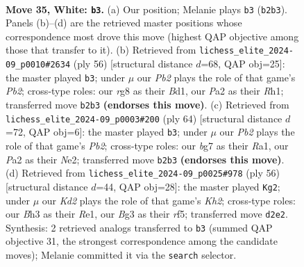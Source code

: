 \documentclass[11pt]{article}
\begin{document}
\clearpage

\begin{figure}[p]\centering
\begin{subfigure}{0.46\textwidth}\centering
\resizebox{\linewidth}{!}{%
\newchessgame
\chessboard[
  setfen={r3k1r1/6bp/p1np2p1/4p1P1/1p2P2P/5PBB/PPPK4/R6R w - - 4 35},
  showmover=false,
  pgfstyle=straightmove, color=movearrow, markmove={b2-b3}
]}
\caption{}
\end{subfigure}\hfill
\begin{subfigure}{0.46\textwidth}\centering
\resizebox{\linewidth}{!}{%
\newchessgame
\chessboard[
  setfen={rr4k1/3n1p2/p2p1bp1/2pPp3/N1P1P3/5P2/1P1B1K1R/3B3R w - - 1 29},
  showmover=false,
  pgfstyle=straightmove, color=movearrow, markmove={b2-b3}
]}
\caption{}
\end{subfigure}
\\[4pt]
\begin{subfigure}{0.46\textwidth}\centering
\resizebox{\linewidth}{!}{%
\newchessgame
\chessboard[
  setfen={2r1k2r/4b3/p5p1/2p1Pp2/Pp2pP2/4K1Pp/1P2N2P/R4R2 w k - 0 33},
  showmover=false,
  pgfstyle=straightmove, color=movearrow, markmove={b2-b3}
]}
\caption{}
\end{subfigure}\hfill
\begin{subfigure}{0.46\textwidth}\centering
\resizebox{\linewidth}{!}{%
\newchessgame
\chessboard[
  setfen={4r1k1/6p1/4p3/2pp1r1p/p6P/PnPPB1P1/5P1K/3RR3 w - - 0 29},
  showmover=false,
  pgfstyle=straightmove, color=movearrow, markmove={h2-g2}
]}
\caption{}
\end{subfigure}
\caption{\textbf{Move 35, White: \texttt{b3}.} (a) Our position; Melanie plays \texttt{b3} (\texttt{b2b3}). Panels (b)--(d) are the retrieved master positions whose correspondence most drove this move (highest QAP objective among those that transfer to it). (b) Retrieved from \texttt{lichess\_elite\_2024-09\_p0010\#2634} (ply 56) [structural distance $d$=68, QAP obj=25]: the master played \texttt{b3}; under $\mu$ our \emph{Pb2} plays the role of that game's \emph{Pb2}; cross-type roles: our \emph{r}g8 as their \emph{B}d1, our \emph{P}a2 as their \emph{R}h1; transferred move \texttt{b2b3} \textbf{(endorses this move)}. (c) Retrieved from \texttt{lichess\_elite\_2024-09\_p0003\#200} (ply 64) [structural distance $d$=72, QAP obj=6]: the master played \texttt{b3}; under $\mu$ our \emph{Pb2} plays the role of that game's \emph{Pb2}; cross-type roles: our \emph{b}g7 as their \emph{R}a1, our \emph{P}a2 as their \emph{N}e2; transferred move \texttt{b2b3} \textbf{(endorses this move)}. (d) Retrieved from \texttt{lichess\_elite\_2024-09\_p0025\#978} (ply 56) [structural distance $d$=44, QAP obj=28]: the master played \texttt{Kg2}; under $\mu$ our \emph{Kd2} plays the role of that game's \emph{Kh2}; cross-type roles: our \emph{B}h3 as their \emph{R}e1, our \emph{B}g3 as their \emph{r}f5; transferred move \texttt{d2e2}. Synthesis: 2 retrieved analogs transferred to \texttt{b3} (summed QAP objective 31, the strongest correspondence among the candidate moves); Melanie committed it via the \texttt{search} selector.}
\label{fig:thought-m68}
\end{figure}
\end{document}
